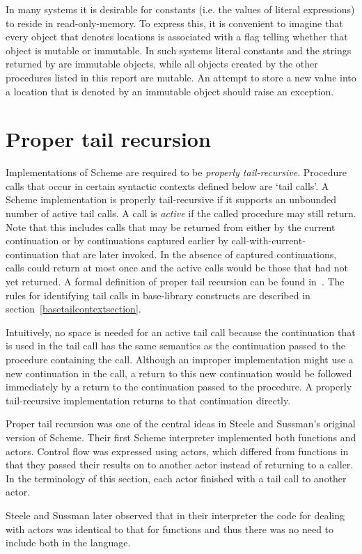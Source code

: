 In many systems it is desirable for constants (i.e. the values of
literal expressions) to reside in read-only-memory.  To express this, it is
convenient to imagine that every object that denotes locations is associated
with a flag telling whether that object is mutable or
immutable.  In such systems literal constants and the strings
returned by  are immutable objects, while all objects
created by the other procedures listed in this report are mutable.  An
attempt to store a new value into a location that is denoted by an
immutable object should raise an exception.

\section{Proper tail recursion}
\label{proper tail recursion}

Implementations of Scheme are required to be
{\em properly tail-recursive}.
Procedure calls that occur in certain syntactic
contexts defined below are `tail calls'.  A Scheme implementation is
properly tail-recursive if it supports an unbounded number of active
tail calls.  A call is {\em active} if the called procedure may still
return.  Note that this includes calls that may be returned from either
by the current continuation or by continuations captured earlier by
{\cf call-with-current-continuation} that are later invoked.
In the absence of captured continuations, calls could
return at most once and the active calls would be those that had not
yet returned.
A formal definition of proper tail recursion can be found
in~\cite{propertailrecursion}.  The rules for identifying tail calls
in base-library constructs are described in
section~\ref{basetailcontextsection}.

\begin{rationale}

Intuitively, no space is needed for an active tail call because the
continuation that is used in the tail call has the same semantics as the
continuation passed to the procedure containing the call.  Although an improper
implementation might use a new continuation in the call, a return
to this new continuation would be followed immediately by a return
to the continuation passed to the procedure.  A properly tail-recursive
implementation returns to that continuation directly.

Proper tail recursion was one of the central ideas in Steele and
Sussman's original version of Scheme.  Their first Scheme interpreter
implemented both functions and actors.  Control flow was expressed using
actors, which differed from functions in that they passed their results
on to another actor instead of returning to a caller.  In the terminology
of this section, each actor finished with a tail call to another actor.

Steele and Sussman later observed that in their interpreter the code
for dealing with actors was identical to that for functions and thus
there was no need to include both in the language.

\end{rationale}


